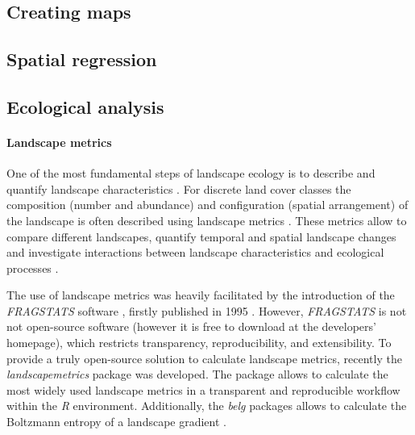 \documentclass[smallextended]{svjour3}       %
\begin{document}
\hypertarget{creating-maps}{%
\subsection{Creating maps}\label{creating-maps}}

\hypertarget{spatial-regression}{%
\subsection{Spatial regression}\label{spatial-regression}}

\hypertarget{sec:ecological_analysis}{%
\subsection{Ecological analysis}\label{sec:ecological_analysis}}

\hypertarget{sec:landscape_metrics}{%
\paragraph{Landscape metrics}\label{sec:landscape_metrics}}

One of the most fundamental steps of landscape ecology is to describe
and quantify landscape characteristics \cite{Turner2005,Lausch2015}. For
discrete land cover classes the composition (number and abundance) and
configuration (spatial arrangement) of the landscape is often described
using landscape metrics
\cite{Gustafson1998,Uuemaa2009,Uuemaa2013,Gustafson2019}. These metrics
allow to compare different landscapes, quantify temporal and spatial
landscape changes and investigate interactions between landscape
characteristics and ecological processes \cite{Uuemaa2009}.

The use of landscape metrics was heavily facilitated by the introduction
of the \emph{FRAGSTATS} software \cite{McGarigal2012}, firstly published
in 1995 \cite{Kupfer2012,Gustafson2019}. However, \emph{FRAGSTATS} is
not not open-source software (however it is free to download at the
developers' homepage), which restricts transparency, reproducibility,
and extensibility. To provide a truly open-source solution to calculate
landscape metrics, recently the \emph{landscapemetrics} package
\cite{Hesselbarth2019a} was developed. The package allows to calculate
the most widely used landscape metrics in a transparent and reproducible
workflow within the \emph{R} environment. Additionally, the \emph{belg}
packages allows to calculate the Boltzmann entropy of a landscape
gradient \cite{Nowosad2019a}.
\end{document}
